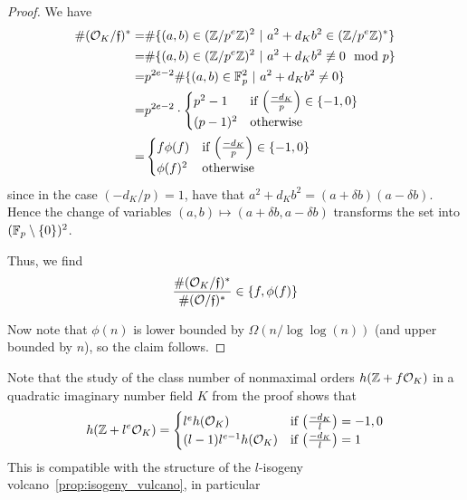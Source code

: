 \begin{proof}
    We have
    \begin{align*}
        \#(\mathcal{O}_K/\mathfrak{f})^* =& \#\{ (a, b) \in (\mathbb{Z}/p^e\mathbb{Z})^2 \ | \ a^2 + d_K b^2 \in (\mathbb{Z}/p^e\mathbb{Z})^* \} \\
        =& \#\{ (a, b) \in (\mathbb{Z}/p^e\mathbb{Z})^2 \ | \ a^2 + d_K b^2 \not\equiv 0 \mod p \} \\
        =& p^{2e - 2} \#\{ (a, b) \in \mathbb{F}_p^2 \ | \ a^2 + d_K b^2 \neq 0 \} \\
        =& p^{2e - 2} \cdot \begin{cases}
            p^2 - 1 & \text{if $\left(\frac {-d_K} p \right) \in \{ -1, 0 \}$} \\
            (p - 1)^2 & \text{otherwise}
        \end{cases} \\
        =& \begin{cases}
            f \phi(f) & \text{if $\left(\frac {-d_K} p \right) \in \{ -1, 0 \}$} \\
            \phi(f)^2 & \text{otherwise}
        \end{cases}
    \end{align*}
    since in the case $(-d_K/p) = 1$, have that $a^2 + d_K b^2 = (a + \delta b)(a - \delta b)$.
    Hence the change of variables $(a, b) \mapsto (a + \delta b, a - \delta b)$ transforms the set into $(\mathbb{F}_p \setminus \{0\})^2$.

    Thus, we find
    \begin{equation*}
        \frac {\#(\mathcal{O}_K/\mathfrak{f})^*} {\#(\mathcal{O}/\mathfrak{f})^*} \in \{ f, \phi(f) \}
    \end{equation*}

    Now note that $\phi(n)$ is lower bounded by $\Omega(n/\log\log(n))$ (and upper bounded by $n$), so the claim follows.
\end{proof}
Note that the study of the class number of nonmaximal orders $h(\mathbb{Z} + f\mathcal{O}_K)$ in a quadratic imaginary number field $K$ from the proof shows that
\begin{equation*}
    h(\mathbb{Z} + l^e\mathcal{O}_K) = \begin{cases}
        l^e h(\mathcal{O}_K) & \text{if $\left(\frac {-d_K} l\right) = -1, 0$} \\
        (l - 1) l^{e - 1} h(\mathcal{O}_K) & \text{if $\left(\frac {-d_K} l\right) = 1$}
    \end{cases}
\end{equation*}
This is compatible with the structure of the $l$-isogeny volcano~\ref{prop:isogeny_vulcano}, in particular
